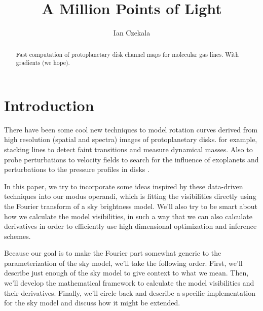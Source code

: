 \documentclass[modern]{aastex62}
\begin{document}
\title{A Million Points of Light}


\author[0000-0002-1483-8811]{Ian Czekala}


\begin{abstract}
Fast computation of protoplanetary disk channel maps for molecular gas lines. With gradients (we hope).
\end{abstract}


\section{Introduction} \label{sec:intro}

There have been some cool new techniques to model rotation curves derived from high resolution (spatial and spectra) images of protoplanetary disks. for example, \citet{yen16,yen18} stacking lines to detect faint transitions and measure dynamical masses. Also to probe perturbations to velocity fields to search for the influence of exoplanets \citet{teague18a} and perturbations to the pressure profiles in disks \citet{teague18c}. 

In this paper, we try to incorporate some ideas inspired by these data-driven techniques into our modus operandi, which is fitting the visibilities directly using the Fourier transform of a sky brightness model. We'll also try to be smart about how we calculate the model visibilities, in such a way that we can also calculate derivatives in order to efficiently use high dimensional optimization and inference schemes. 

Because our goal is to make the Fourier part somewhat generic to the parameterization of the sky model, we'll take the following order. First, we'll describe just enough of the sky model to give context to what we mean. Then, we'll develop the mathematical framework to calculate the model visibilities and their derivatives. Finally, we'll circle back and describe a specific implementation for the sky model and discuss how it might be extended.
\end{document}
